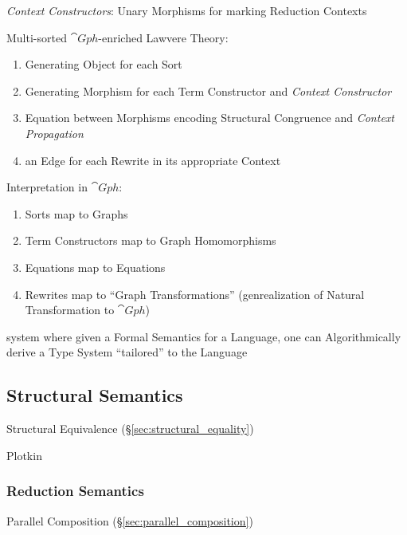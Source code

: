 \emph{Context Constructors}: Unary Morphisms for marking Reduction
Contexts

Multi-sorted $\cat{Gph}$-enriched Lawvere Theory:
\begin{enumerate}
  \item Generating Object for each Sort
  \item Generating Morphism for each Term Constructor and
    \emph{Context Constructor}
  \item Equation between Morphisms encoding Structural Congruence and
    \emph{Context Propagation}
  \item an Edge for each Rewrite in its appropriate Context
\end{enumerate}

Interpretation in $\cat{Gph}$:
\begin{enumerate}
  \item Sorts map to Graphs
  \item Term Constructors map to Graph Homomorphisms
  \item Equations map to Equations
  \item Rewrites map to ``Graph Transformations'' (genrealization of
    Natural Transformation to $\cat{Gph}$)
\end{enumerate}

system where given a Formal Semantics for a Language, one can
Algorithmically derive a Type System ``tailored'' to the Language



\subsection{Structural Semantics}\label{sec:structural_semantics}

Structural Equivalence (\S\ref{sec:structural_equality})

Plotkin



\subsubsection{Reduction Semantics}\label{sec:reduction_semantics}

Parallel Composition (\S\ref{sec:parallel_composition})



